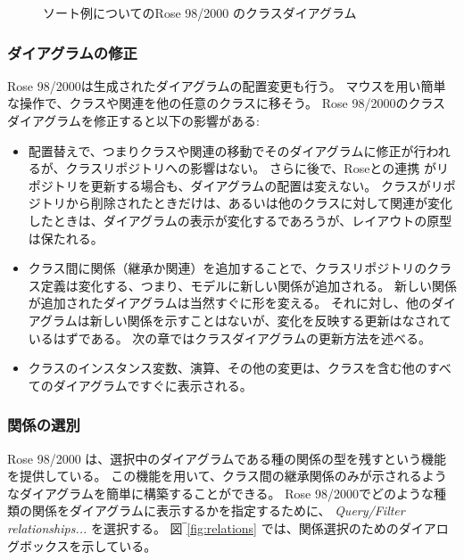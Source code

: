 \documentclass[\pformat,12pt]{jarticle}
\newcommand{\link}{Roseとの連携}
\newcommand{\rose}{Rose 98/2000}
\begin{document}
\begin{figure}[htb]
\begin{center}
\mbox{}
\caption{ソート例についての\rose{} のクラスダイアグラム　\label{fig:classdiagram}}
\end{center}
\end{figure}

\subsubsection*{ダイアグラムの修正}

\rose{}は生成されたダイアグラムの配置変更も行う。
マウスを用い簡単な操作で、クラスや関連を他の任意のクラスに移そう。
\rose{}のクラスダイアグラムを修正すると以下の影響がある:  

\begin{itemize}
\item 配置替えで、つまりクラスや関連の移動でそのダイアグラムに修正が行われるが、クラスリポジトリへの影響はない。
さらに後で、\link{} がリポジトリを更新する場合も、ダイアグラムの配置は変えない。
クラスがリポジトリから削除されたときだけは、あるいは他のクラスに対して関連が変化したときは、ダイアグラムの表示が変化するであろうが、レイアウトの原型は保たれる。
\item クラス間に関係（継承か関連）を追加することで、クラスリポジトリのクラス定義は変化する、つまり、モデルに新しい関係が追加される。
新しい関係が追加されたダイアグラムは当然すぐに形を変える。
それに対し、他のダイアグラムは新しい関係を示すことはないが、変化を反映する更新はなされているはずである。
次の章ではクラスダイアグラムの更新方法を述べる。
\item クラスのインスタンス変数、演算、その他の変更は、クラスを含む他のすべてのダイアグラムですぐに表示される。
\end{itemize}

\subsubsection*{関係の選別}
 
\rose{} は、選択中のダイアグラムである種の関係の型を残すという機能を提供している。
この機能を用いて、クラス間の継承関係のみが示されるようなダイアグラムを簡単に構築することができる。
 \rose{}でどのような種類の関係をダイアグラムに表示するかを指定するために、 {\it Query/Filter relationships...} を選択する。
図‾\ref{fig:relations} では、関係選択のためのダイアログボックスを示している。
\end{document}
